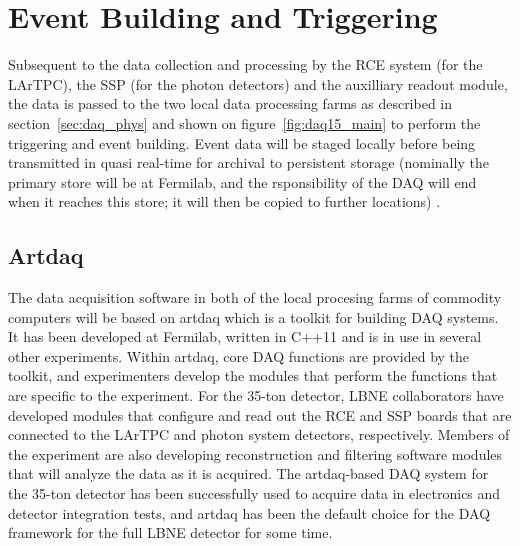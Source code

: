 \section{Event Building and Triggering}
\label{sec:daq_artDAQ}

Subsequent to the data collection and processing by the RCE system
(for the LArTPC), the SSP (for the photon detectors) and the
auxilliary readout module, the data is passed to the two local data
processing farms as described in section~\ref{sec:daq_phys} and shown
on figure~\ref{fig:daq15_main} to perform the triggering and event
building.  Event data will be staged locally before being transmitted
in quasi real-time for archival to persistent storage (nominally the
primary store will be at Fermilab, and the rsponsibility of the DAQ
will end when it reaches this store; it will then be copied to further
locations) .

\subsection{Artdaq}

The data acquisition software in both of the local procesing farms of
commodity computers will be based on artdaq which is a toolkit for
building DAQ systems.  It has been developed at Fermilab, written in
C++11 and is in use in several other experiments.  Within artdaq, core
DAQ functions are provided by the toolkit, and experimenters develop
the modules that perform the functions that are specific to the
experiment.  For the 35-ton detector, LBNE collaborators have
developed modules that configure and read out the RCE and SSP boards
that are connected to the LArTPC and photon system detectors,
respectively.  Members of the experiment are also developing
reconstruction and filtering software modules that will analyze the
data as it is acquired.  The artdaq-based DAQ system for the 35-ton
detector has been successfully used to acquire data in electronics and
detector integration tests, and artdaq has been the default choice for
the DAQ framework for the full LBNE detector for some time.

